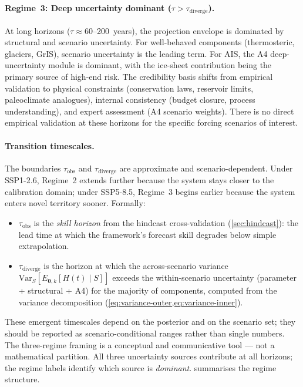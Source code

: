 \documentclass[11pt]{article}
\begin{document}
\paragraph{Regime~3: Deep uncertainty dominant ($\tau > \tau_{\text{diverge}}$).}
At long horizons ($\tau \approx 60$--200~years), the projection envelope is dominated by structural and scenario uncertainty.  For well-behaved components (thermosteric, glaciers, GrIS), scenario uncertainty is the leading term.  For AIS, the A4 deep-uncertainty module is dominant, with the ice-sheet contribution being the primary source of high-end risk.  The credibility basis shifts from empirical validation to physical constraints (conservation laws, reservoir limits, paleoclimate analogues), internal consistency (budget closure, process understanding), and expert assessment (A4 scenario weights).  There is no direct empirical validation at these horizons for the specific forcing scenarios of interest.

\paragraph{Transition timescales.}
The boundaries $\tau_{\text{obs}}$ and $\tau_{\text{diverge}}$ are approximate and scenario-dependent.  Under SSP1-2.6, Regime~2 extends further because the system stays closer to the calibration domain; under SSP5-8.5, Regime~3 begins earlier because the system enters novel territory sooner.  Formally:
\begin{itemize}
  \item $\tau_{\text{obs}}$ is the \emph{skill horizon} from the hindcast cross-validation (\cref{sec:hindcast}): the lead time at which the framework's forecast skill degrades below simple extrapolation.
  \item $\tau_{\text{diverge}}$ is the horizon at which the across-scenario variance $\text{Var}_S[E_{\boldsymbol{\theta},k}[H(t) \mid S]]$ exceeds the within-scenario uncertainty (parameter + structural + A4) for the majority of components, computed from the variance decomposition (\cref{eq:variance-outer,eq:variance-inner}).
\end{itemize}

These emergent timescales depend on the posterior and on the scenario set; they should be reported as scenario-conditional ranges rather than single numbers.  The three-regime framing is a conceptual and communicative tool --- not a mathematical partition.  All three uncertainty sources contribute at all horizons; the regime labels identify which source is \emph{dominant}.   summarises the regime structure.
\end{document}
